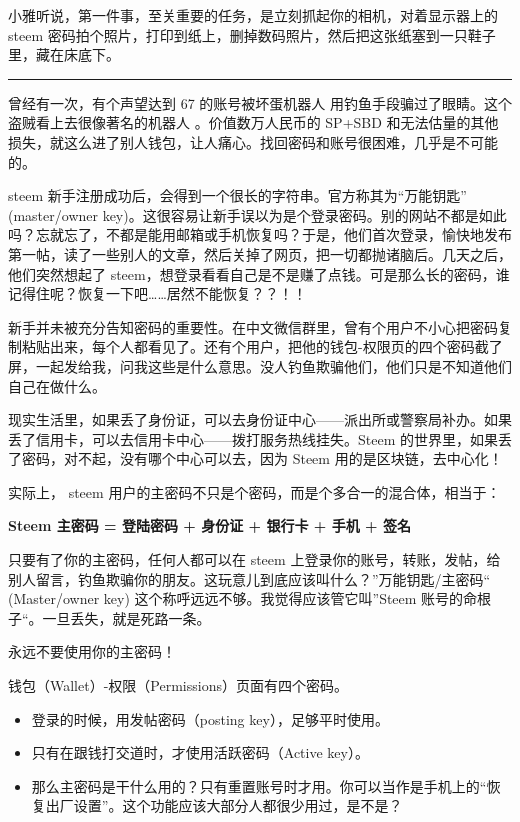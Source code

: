 \documentclass[]{ctexbook}
\begin{document}
小雅听说，第一件事，至关重要的任务，是立刻抓起你的相机，对着显示器上的 steem 密码拍个照片，打印到纸上，删掉数码照片，然后把这张纸塞到一只鞋子里，藏在床底下。

\begin{center}\rule{0.5\linewidth}{\linethickness}\end{center}

曾经有一次，有个声望达到 67 的账号被坏蛋机器人 \citet{cheetoh} 用钓鱼手段骗过了眼睛。这个盗贼看上去很像著名的机器人 \citet{cheetah}。价值数万人民币的 SP+SBD 和无法估量的其他损失，就这么进了别人钱包，让人痛心。找回密码和账号很困难，几乎是不可能的。

steem 新手注册成功后，会得到一个很长的字符串。官方称其为``万能钥匙'' (master/owner key)。这很容易让新手误以为是个登录密码。别的网站不都是如此吗？忘就忘了，不都是能用邮箱或手机恢复吗？于是，他们首次登录，愉快地发布第一帖，读了一些别人的文章，然后关掉了网页，把一切都抛诸脑后。几天之后，他们突然想起了 steem，想登录看看自己是不是赚了点钱。可是那么长的密码，谁记得住呢？恢复一下吧\ldots{}\ldots{}居然不能恢复？？！！

新手并未被充分告知密码的重要性。在中文微信群里，曾有个用户不小心把密码复制粘贴出来，每个人都看见了。还有个用户，把他的钱包-权限页的四个密码截了屏，一起发给我，问我这些是什么意思。没人钓鱼欺骗他们，他们只是不知道他们自己在做什么。

现实生活里，如果丢了身份证，可以去身份证中心------派出所或警察局补办。如果丢了信用卡，可以去信用卡中心------拨打服务热线挂失。Steem 的世界里，如果丢了密码，对不起，没有哪个中心可以去，因为 Steem 用的是区块链，去中心化！

实际上， steem 用户的主密码不只是个密码，而是个多合一的混合体，相当于：

\textbf{Steem 主密码 = 登陆密码 + 身份证 + 银行卡 + 手机 + 签名}

只要有了你的主密码，任何人都可以在 steem 上登录你的账号，转账，发帖，给别人留言，钓鱼欺骗你的朋友。这玩意儿到底应该叫什么？''万能钥匙/主密码`` (Master/owner key) 这个称呼远远不够。我觉得应该管它叫''Steem 账号的命根子``。一旦丢失，就是死路一条。

永远不要使用你的主密码！

钱包（Wallet）-权限（Permissions）页面有四个密码。

\begin{itemize}
\item
  登录的时候，用发帖密码（posting key），足够平时使用。
\item
  只有在跟钱打交道时，才使用活跃密码（Active key）。
\item
  那么主密码是干什么用的？只有重置账号时才用。你可以当作是手机上的``恢复出厂设置''。这个功能应该大部分人都很少用过，是不是？
\end{itemize}
\end{document}

